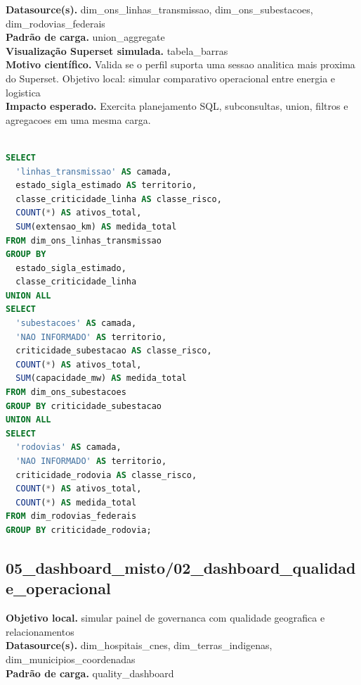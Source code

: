 \documentclass[11pt,a4paper]{article}
\begin{document}
\textbf{Datasource(s).} dim\_ons\_linhas\_transmissao, dim\_ons\_subestacoes, dim\_rodovias\_federais\\

\textbf{Padrão de carga.} union\_aggregate\\

\textbf{Visualização Superset simulada.} tabela\_barras\\

\textbf{Motivo científico.} Valida se o perfil suporta uma sessao analitica mais proxima do Superset. Objetivo local: simular comparativo operacional entre energia e logistica\\

\textbf{Impacto esperado.} Exercita planejamento SQL, subconsultas, union, filtros e agregacoes em uma mesma carga.

\begin{lstlisting}[language=SQL]

SELECT
  'linhas_transmissao' AS camada,
  estado_sigla_estimado AS territorio,
  classe_criticidade_linha AS classe_risco,
  COUNT(*) AS ativos_total,
  SUM(extensao_km) AS medida_total
FROM dim_ons_linhas_transmissao
GROUP BY
  estado_sigla_estimado,
  classe_criticidade_linha
UNION ALL
SELECT
  'subestacoes' AS camada,
  'NAO INFORMADO' AS territorio,
  criticidade_subestacao AS classe_risco,
  COUNT(*) AS ativos_total,
  SUM(capacidade_mw) AS medida_total
FROM dim_ons_subestacoes
GROUP BY criticidade_subestacao
UNION ALL
SELECT
  'rodovias' AS camada,
  'NAO INFORMADO' AS territorio,
  criticidade_rodovia AS classe_risco,
  COUNT(*) AS ativos_total,
  COUNT(*) AS medida_total
FROM dim_rodovias_federais
GROUP BY criticidade_rodovia;

\end{lstlisting}

\subsection{05\_dashboard\_misto/02\_dashboard\_qualidade\_operacional}

\textbf{Objetivo local.} simular painel de governanca com qualidade geografica e relacionamentos\\

\textbf{Datasource(s).} dim\_hospitais\_cnes, dim\_terras\_indigenas, dim\_municipios\_coordenadas\\

\textbf{Padrão de carga.} quality\_dashboard\\
\end{document}
